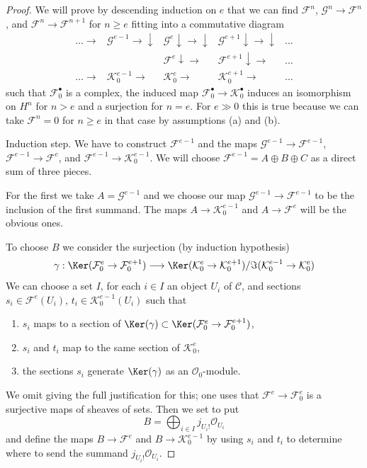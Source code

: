 \begin{proof}
We will prove by descending induction on $e$ that we can find $\mathcal{F}^n$,
$\mathcal{G}^n \to \mathcal{F}^n$, and
$\mathcal{F}^n \to \mathcal{F}^{n + 1}$ for $n \geq e$
fitting into a commutative diagram
$$
\begin{array}{ccccc}\ldots \longrightarrow & \mathcal{G}^{e - 1} \longrightarrow\downarrow & \mathcal{G}^e \downarrow\longrightarrow\downarrow & \mathcal{G}^{e + 1} \downarrow\longrightarrow\downarrow & \ldots \\  &  & \mathcal{F}^e \downarrow\longrightarrow & \mathcal{F}^{e + 1} \downarrow\longrightarrow & \ldots \\ \ldots  \longrightarrow & \mathcal{K}_0^{e - 1} \longrightarrow & \mathcal{K}_0^e \longrightarrow & \mathcal{K}_0^{e + 1} \longrightarrow & \ldots\end{array}
$$
such that $\mathcal{F}_0^\bullet$ is a complex,
the induced map $\mathcal{F}_0^\bullet \to \mathcal{K}_0^\bullet$
induces an isomorphism on $H^n$ for $n > e$ and a surjection
for $n = e$. For $e \gg 0$ this is true because we can take
$\mathcal{F}^n = 0$ for $n \geq e$ in that case by assumptions
(a) and (b).

\medskip\noindent
Induction step. We have to construct $\mathcal{F}^{e - 1}$
and the maps $\mathcal{G}^{e - 1} \to \mathcal{F}^{e - 1}$,
$\mathcal{F}^{e - 1} \to \mathcal{F}^e$, and
$\mathcal{F}^{e - 1} \to \mathcal{K}_0^{e - 1}$.
We will choose $\mathcal{F}^{e - 1} = A \oplus B \oplus C$
as a direct sum of three pieces.

\medskip\noindent
For the first we take $A = \mathcal{G}^{e - 1}$ and we choose our map
$\mathcal{G}^{e - 1} \to \mathcal{F}^{e - 1}$ to be the inclusion of
the first summand. The maps $A \to \mathcal{K}^{e - 1}_0$
and $A \to \mathcal{F}^e$ will be the obvious ones.

\medskip\noindent
To choose $B$ we consider the surjection (by induction hypothesis)
$$
\gamma :
\Ker(\mathcal{F}^e_0 \to \mathcal{F}^{e + 1}_0)
\longrightarrow
\Ker(\mathcal{K}^e_0 \to \mathcal{K}^{e + 1}_0)/
\Im(\mathcal{K}^{e - 1}_0 \to \mathcal{K}^e_0)
$$
We can choose a set $I$, for each $i \in I$
an object $U_i$ of $\mathcal{C}$, and sections
$s_i \in \mathcal{F}^e(U_i)$, $t_i \in \mathcal{K}^{e - 1}_0(U_i)$
such that
\begin{enumerate}
\item $s_i$ maps to a section of $\Ker(\gamma) \subset
\Ker(\mathcal{F}^e_0 \to \mathcal{F}^{e + 1}_0)$,
\item $s_i$ and $t_i$ map to the same section of
$\mathcal{K}^e_0$,
\item the sections $s_i$ generate $\Ker(\gamma)$ as an $\mathcal{O}_0$-module.
\end{enumerate}
We omit giving the full justification for this;
one uses that $\mathcal{F}^e \to \mathcal{F}^e_0$
is a surjective maps of sheaves of sets. Then we set
to put
$$
B = \bigoplus\nolimits_{i \in I} j_{U_i!}\mathcal{O}_{U_i}
$$
and define the maps $B \to \mathcal{F}^e$ and $B \to \mathcal{K}_0^{e - 1}$
by using $s_i$ and $t_i$ to determine where to send the summand
$j_{U_i!}\mathcal{O}_{U_i}$.


\end{proof}
